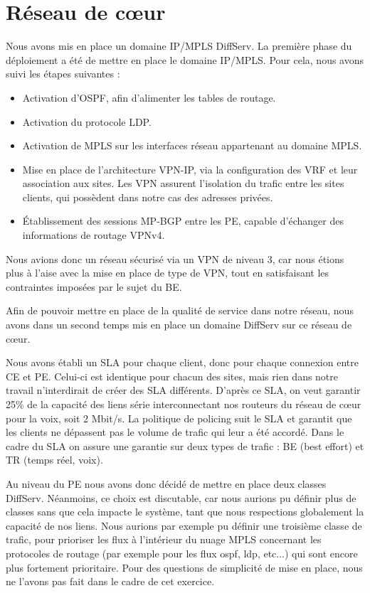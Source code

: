 \documentclass[a4paper,11pt]{article}
\let\Oldsection\section
\renewcommand{\section}{\FloatBarrier\Oldsection}
\begin{document}
\section{Réseau de cœur}

Nous avons mis en place un domaine IP/MPLS DiffServ. 
La première phase du déploiement a été de mettre en place le domaine IP/MPLS. Pour cela, nous avons suivi les étapes suivantes :
\begin{itemize}
    \item Activation d'OSPF, afin d’alimenter les tables de routage.
    \item Activation du protocole LDP.
    \item Activation de MPLS sur les interfaces réseau appartenant au domaine MPLS.
    \item Mise en place de l'architecture VPN-IP, via la configuration des VRF et leur association aux sites. Les VPN assurent l’isolation du trafic entre les sites clients, qui possèdent dans notre cas des adresses privées.
    \item Établissement des sessions MP-BGP entre les PE, capable d'échanger des informations de routage VPNv4.
\end{itemize}

Nous avions donc un réseau sécurisé via un VPN de niveau 3, car nous étions plus à l'aise avec la mise en place de type de VPN, tout en satisfaisant les contraintes imposées par le sujet du BE. 

Afin de pouvoir mettre en place de la qualité de service dans notre réseau, nous avons dans un second temps mis en place un domaine DiffServ sur ce réseau de cœur. 

Nous avons établi un SLA pour chaque client, donc pour chaque connexion entre CE et PE. Celui-ci est identique pour chacun des sites, mais rien dans notre travail n'interdirait de créer des SLA différents. D’après ce SLA, on veut garantir 25\% de la capacité des liens série interconnectant nos routeurs du réseau de cœur pour la voix, soit 2 Mbit/s. 
La politique de policing suit le SLA et garantit que les clients ne dépassent pas le volume de trafic qui leur a été accordé. Dans le cadre du SLA on assure une garantie sur deux types de trafic : BE (best effort) et TR (temps réel, voix). 

Au niveau du PE nous avons donc décidé de mettre en place deux classes DiffServ. Néanmoins, ce choix est discutable, car nous aurions pu définir plus de classes sans que cela impacte le système, tant que nous respections globalement la capacité de nos liens. Nous aurions par exemple pu définir une troisième classe de trafic, pour prioriser les flux à l’intérieur du nuage MPLS concernant les protocoles de routage (par exemple pour les flux ospf, ldp, etc...) qui sont encore plus fortement prioritaire. Pour des questions de simplicité de mise en place, nous ne l’avons pas fait dans le cadre de cet exercice.
\end{document}
